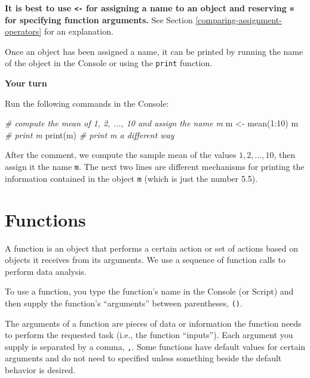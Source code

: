 \documentclass[
]{book}
\newenvironment{Shaded}{\begin{snugshade}}{\end{snugshade}}
\newcommand{\CommentTok}[1]{\textcolor[rgb]{0.56,0.35,0.01}{\textit{#1}}}
\newcommand{\DecValTok}[1]{\textcolor[rgb]{0.00,0.00,0.81}{#1}}
\newcommand{\FunctionTok}[1]{\textcolor[rgb]{0.00,0.00,0.00}{#1}}
\newcommand{\NormalTok}[1]{#1}
\newcommand{\OtherTok}[1]{\textcolor[rgb]{0.56,0.35,0.01}{#1}}
\newcommand{\SpecialCharTok}[1]{\textcolor[rgb]{0.00,0.00,0.00}{#1}}
\theoremstyle{definition}
\theoremstyle{definition}
\theoremstyle{definition}
\theoremstyle{definition}
\theoremstyle{remark}
\begin{document}
\textbf{It is best to use \texttt{\textless{}-} for assigning a name to an object and reserving \texttt{=} for specifying function arguments.} See Section \ref{comparing-assignment-operators} for an explanation.

Once an object has been assigned a name, it can be printed by running the name of the object in the Console or using the \texttt{print} function.

\begin{yourturn}
\textbf{Your turn}

Run the following commands in the Console:

\begin{Shaded}
\begin{Highlighting}[]
\CommentTok{\# compute the mean of 1, 2, ..., 10 and assign the name m}
\NormalTok{m }\OtherTok{\textless{}{-}} \FunctionTok{mean}\NormalTok{(}\DecValTok{1}\SpecialCharTok{:}\DecValTok{10}\NormalTok{) }
\NormalTok{m }\CommentTok{\# print m}
\FunctionTok{print}\NormalTok{(m) }\CommentTok{\# print m a different way}
\end{Highlighting}
\end{Shaded}

After the comment, we compute the sample mean of the values \(1, 2, \ldots, 10\), then assign it the name \texttt{m}. The next two lines are different mechanisms for printing the information contained in the object \texttt{m} (which is just the number 5.5).

\end{yourturn}

\hypertarget{functions}{%
\section{Functions}\label{functions}}

A function is an object that performs a certain action or set of actions based on objects it receives from its arguments. We use a sequence of function calls to perform data analysis.

To use a function, you type the function's name in the Console (or Script) and then supply the function's ``arguments'' between parentheses, \texttt{()}.

The arguments of a function are pieces of data or information the function needs to perform the requested task (i.e., the function ``inputs''). Each argument you supply is separated by a comma, \texttt{,}. Some functions have default values for certain arguments and do not need to specified unless something beside the default behavior is desired.
\end{document}
